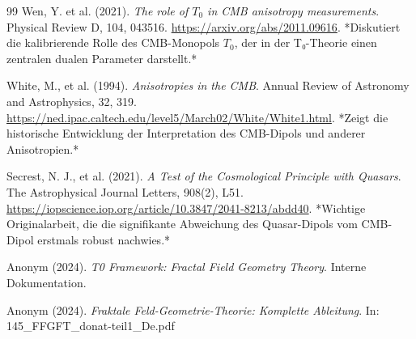 \documentclass[12pt,a4paper]{article}
\begin{document}
\begin{thebibliography}{99}
		Wen, Y. et al. (2021). \textit{The role of \(T_0\) in CMB anisotropy measurements}. 
		Physical Review D, 104, 043516.
		\href{https://arxiv.org/abs/2011.09616}{https://arxiv.org/abs/2011.09616}.
		*Diskutiert die kalibrierende Rolle des CMB-Monopols \(T_0\), der in der T₀-Theorie einen zentralen dualen Parameter darstellt.*
		
		White, M., et al. (1994). \textit{Anisotropies in the CMB}. 
		Annual Review of Astronomy and Astrophysics, 32, 319.
		\href{https://ned.ipac.caltech.edu/level5/March02/White/White1.html}{https://ned.ipac.caltech.edu/level5/March02/White/White1.html}.
		*Zeigt die historische Entwicklung der Interpretation des CMB-Dipols und anderer Anisotropien.*
		
		Secrest, N. J., et al. (2021). \textit{A Test of the Cosmological Principle with Quasars}. 
		The Astrophysical Journal Letters, 908(2), L51.
		\href{https://iopscience.iop.org/article/10.3847/2041-8213/abdd40}{https://iopscience.iop.org/article/10.3847/2041-8213/abdd40}.
		*Wichtige Originalarbeit, die die signifikante Abweichung des Quasar-Dipols vom CMB-Dipol erstmals robust nachwies.*
		
		Anonym (2024). \textit{T0 Framework: Fractal Field Geometry Theory}. 
		Interne Dokumentation.
		
		Anonym (2024). \textit{Fraktale Feld-Geometrie-Theorie: Komplette Ableitung}. 
		In: 145\_FFGFT\_donat-teil1\_De.pdf
		
	\end{thebibliography}
	
\end{document}
